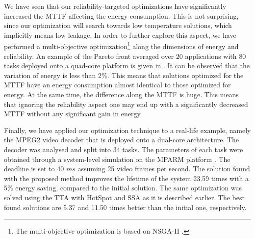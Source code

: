 We have seen that our reliability-targeted optimizations have significantly increased the MTTF  affecting the energy consumption. This is not surprising, since our optimization will search towards low temperature solutions, which implicitly means low leakage. In order to further explore this aspect, we have performed a multi-objective optimization\footnote{The multi-objective optimization is based on NSGA-II \cite{deb2002}.} along the dimensions of energy and reliability. An example of the Pareto front averaged over 20 applications with 80 tasks deployed onto a quad-core platform is given in . It can be observed that the variation of energy is less than 2\%. This means that solutions optimized for the MTTF have an energy consumption almost identical to those optimized for energy. At the same time, the difference along the MTTF is huge. This means that ignoring the reliability aspect one may end up with a significantly decreased MTTF without any significant gain in energy.

Finally, we have applied our optimization technique to a real-life example, namely the MPEG2 video decoder \cite{ffmpeg2011} that is deployed onto a dual-core architecture. The decoder was analysed and split into 34 tasks. The parameters of each task were obtained through a system-level simulation on the MPARM platform \cite{benini2005}. The deadline is set to 40 $ms$ assuming 25 video frames per second. The solution found with the proposed method improves the lifetime of the system 23.59 times with a 5\% energy saving, compared to the initial solution. The same optimization was solved using the TTA with HotSpot and SSA as it is described earlier. The best found solutions are 5.37 and 11.50 times better than the initial one, respectively.

